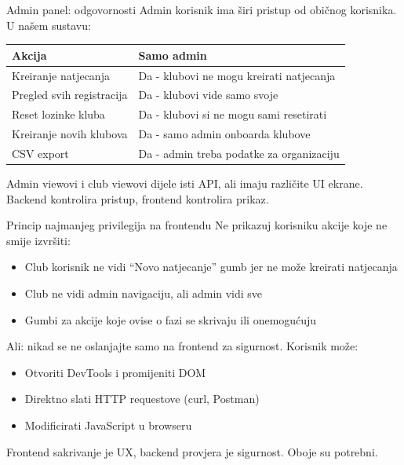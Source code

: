 \begin{frame}{Admin panel: odgovornosti}
Admin korisnik ima širi pristup od običnog korisnika. U našem sustavu:

\vspace{0.4em}
\begin{tabular}{@{}lp{8cm}@{}}
  \toprule
  \textbf{Akcija} & \textbf{Samo admin} \\
  \midrule
  Kreiranje natjecanja & Da - klubovi ne mogu kreirati natjecanja \\
  Pregled svih registracija & Da - klubovi vide samo svoje \\
  Reset lozinke kluba & Da - klubovi si ne mogu sami resetirati \\
  Kreiranje novih klubova & Da - samo admin onboarda klubove \\
  CSV export & Da - admin treba podatke za organizaciju \\
  \bottomrule
\end{tabular}

\vspace{0.6em}
Admin viewovi i club viewovi dijele isti API, ali imaju različite UI ekrane. Backend kontrolira pristup, frontend kontrolira prikaz.
\end{frame}

\begin{frame}{Princip najmanjeg privilegija na frontendu}
Ne prikazuj korisniku akcije koje ne smije izvršiti:

\vspace{0.4em}
\begin{itemize}
  \item Club korisnik ne vidi \enquote{Novo natjecanje} gumb jer ne može kreirati natjecanja
  \item Club ne vidi admin navigaciju, ali admin vidi sve
  \item Gumbi za akcije koje ovise o fazi se skrivaju ili onemogućuju
\end{itemize}

\vspace{0.6em}
Ali: nikad se ne oslanjajte samo na frontend za sigurnost. Korisnik može:
\begin{itemize}
  \item Otvoriti DevTools i promijeniti DOM
  \item Direktno slati HTTP requestove (curl, Postman)
  \item Modificirati JavaScript u browseru
\end{itemize}

\vspace{0.4em}
Frontend sakrivanje je UX, backend provjera je sigurnost. Oboje su potrebni.
\end{frame}

